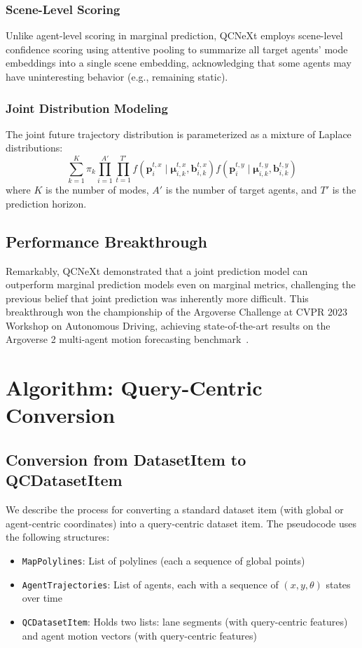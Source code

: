 \subsubsection{Scene-Level Scoring}
Unlike agent-level scoring in marginal prediction, QCNeXt employs scene-level confidence scoring using attentive pooling to summarize all target agents' mode embeddings into a single scene embedding, acknowledging that some agents may have uninteresting behavior (e.g., remaining static).

\subsubsection{Joint Distribution Modeling}
The joint future trajectory distribution is parameterized as a mixture of Laplace distributions:
\begin{equation}
\sum_{k=1}^K \pi_{k} \prod_{i=1}^{A'} \prod_{t=1}^{T'} f\left(\mathbf{p}_i^{t,x} \mid \boldsymbol{\mu}_{i,k}^{t,x}, \mathbf{b}_{i,k}^{t,x}\right) f\left(\mathbf{p}_i^{t,y} \mid \boldsymbol{\mu}_{i,k}^{t,y}, \mathbf{b}_{i,k}^{t,y}\right)
\end{equation}
where $K$ is the number of modes, $A'$ is the number of target agents, and $T'$ is the prediction horizon.

\subsection{Performance Breakthrough}
Remarkably, QCNeXt demonstrated that a joint prediction model can outperform marginal prediction models even on marginal metrics, challenging the previous belief that joint prediction was inherently more difficult. This breakthrough won the championship of the Argoverse Challenge at CVPR 2023 Workshop on Autonomous Driving, achieving state-of-the-art results on the Argoverse 2 multi-agent motion forecasting benchmark~\cite{av2Wilson2023}.

\section{Algorithm: Query-Centric Conversion}
\subsection*{Conversion from DatasetItem to QCDatasetItem}
We describe the process for converting a standard dataset item (with global or agent-centric coordinates) into a query-centric dataset item. The pseudocode uses the following structures:
\begin{itemize}
    \item \texttt{MapPolylines}: List of polylines (each a sequence of global points)
    \item \texttt{AgentTrajectories}: List of agents, each with a sequence of $(x, y, \theta)$ states over time
    \item \texttt{QCDatasetItem}: Holds two lists: lane segments (with query-centric features) and agent motion vectors (with query-centric features)
\end{itemize}

